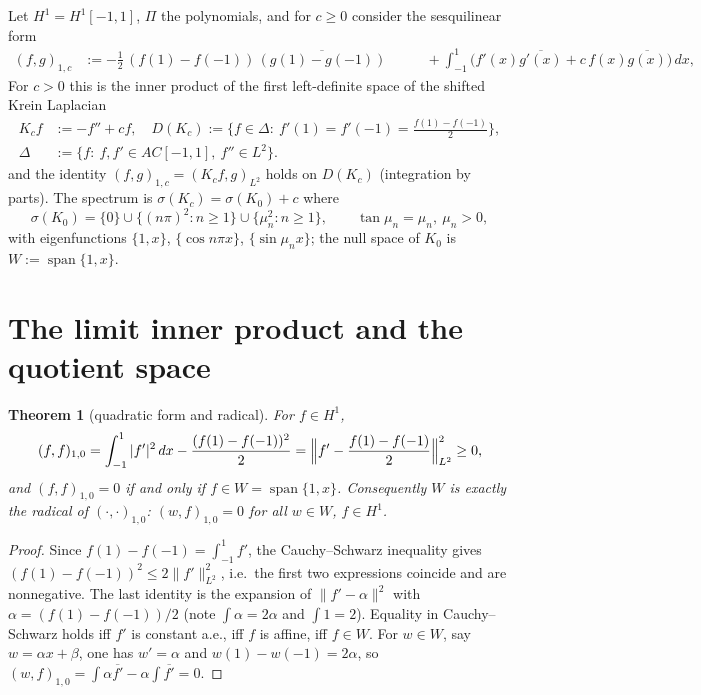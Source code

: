 ﻿\documentclass[11pt]{article}
\newtheorem{theorem}{Theorem}[section]
\begin{document}
Let $H^1=H^1[-1,1]$, $\Pi$ the polynomials, and for $c\ge 0$ consider the
sesquilinear form \cite[eq.~(2)]{axioms}
\begin{equation}
	\begin{aligned}
		(f,g)_{1,c}&:=-\tfrac12\,(f(1)-f(-1))\,\overline{(g(1)-g(-1))}
		&\qquad+\int_{-1}^1\bigl(f'(x)\overline{g'(x)}+c\,f(x)\overline{g(x)}\bigr)\,dx,
	\end{aligned}
	\label{eq:ld}
\end{equation}
For $c>0$ this is the inner product of the first left-definite space of the
shifted Krein Laplacian \cite[eqs.~(3)--(4)]{axioms}
\begin{equation*}
	\begin{aligned}
		K_c f&:=-f''+cf,\quad D(K_c):=\bigl\{f\in\Delta:\ f'(1)=f'(-1)=\tfrac{f(1)-f(-1)}2\bigr\},\\
		\Delta&:=\{f:\ f,f'\in AC[-1,1],\ f''\in L^2\}.
	\end{aligned}
\end{equation*}
and the identity $(f,g)_{1,c}=(K_c f,g)_{L^2}$ holds on $D(K_c)$ (integration
by parts).  The spectrum is $\sigma(K_c)=\sigma(K_0)+c$ where
\cite[eq.~(7)]{axioms}
\begin{equation*}
	\sigma(K_0)=\{0\}\cup\{(n\pi)^2:n\ge 1\}\cup\{\mu_n^2:n\ge 1\},
	\qquad \tan\mu_n=\mu_n,\ \mu_n>0,
\end{equation*}
with eigenfunctions $\{1,x\}$, $\{\cos n\pi x\}$, $\{\sin\mu_n x\}$; the null
space of $K_0$ is $W:=\operatorname{span}\{1,x\}$.

\section{The limit inner product and the quotient space}

\begin{theorem}[quadratic form and radical]\label{thm:radical}
	For $f\in H^1$,
	\begin{equation*}
		(f,f)_{1,0}=\int_{-1}^1|f'|^2\,dx-\frac{(f(1)-f(-1))^2}{2}
		=\Bigl\|f'-\frac{f(1)-f(-1)}2\Bigr\|_{L^2}^2\ge 0,
	\end{equation*}
	and $(f,f)_{1,0}=0$ if and only if $f\in W=\operatorname{span}\{1,x\}$.
	Consequently $W$ is exactly the radical of $(\cdot,\cdot)_{1,0}$:
	$(w,f)_{1,0}=0$ for all $w\in W$, $f\in H^1$.
\end{theorem}

\begin{proof}
	Since $f(1)-f(-1)=\int_{-1}^1 f'$, the Cauchy--Schwarz inequality gives
	$(f(1)-f(-1))^2\le 2\|f'\|_{L^2}^2$, i.e.\ the first two expressions
	coincide and are nonnegative.  The last identity is the expansion of
	$\|f'-\alpha\|^2$ with $\alpha=(f(1)-f(-1))/2$ (note $\int\alpha =2\alpha$
	and $\int 1 =2$).  Equality in Cauchy--Schwarz holds iff $f'$ is constant
	a.e., iff $f$ is affine, iff $f\in W$.  For $w\in W$, say $w=\alpha x+\beta$,
	one has $w'=\alpha$ and $w(1)-w(-1)=2\alpha$, so
	$(w,f)_{1,0}=\int \alpha\overline{f'}-\alpha\int\overline{f'}=0$.
\end{proof}
\end{document}
